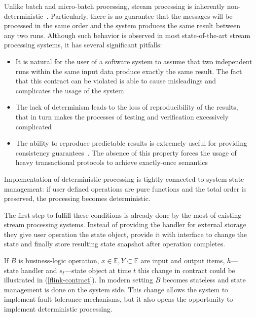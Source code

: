 
\label{motivation-section}

Unlike batch and micro-batch processing, stream processing is inherently non-deterministic~\cite{Zaharia:2012:DSE:2342763.2342773}. Particularly, there is no guarantee that the messages will be processed in the same order and the system produces the same result between any two runs. Although such behavior is observed in most state-of-the-art stream processing systems, it has several significant pitfalls:

\begin{itemize}
    \item It is natural for the user of a software system to assume that two independent runs within the same input data produce exactly the same result. The fact that this contract can be violated is able to cause misleadings and complicates the usage of the system
    \item The lack of determinism leads to the loss of reproducibility of the results, that in turn makes the processes of testing and verification excessively complicated
    \item The ability to reproduce predictable results is extremely useful for providing consistency guarantees~\cite{Stonebraker:2005:RRS:1107499.1107504}. The absence of this property forces the usage of heavy transactional protocols to achieve exactly-once semantics~\cite{Carbone:2017:SMA:3137765.3137777, jacques2016consistent}
\end{itemize}

Implementation of deterministic processing is tightly connected to system state management: if user defined operations are pure functions and the total order is preserved, the processing becomes deterministic.

The first step to fulfill these conditions is already done by the most of existing stream processing systems. Instead of providing the handler for external storage they give user operation the state object, provide it with interface to change the state and finally store resulting state snapshot after operation completes.

If $B$ is business-logic operation, $x \in \mathbb{E}, Y \subset \mathbb{E}$ are input and output items, $h$---state handler and $s_t$---state object at time $t$ this change in contract could be illustrated in (\ref{flink-contract}). In modern setting $B$ becomes stateless and state management is done on the system side. This change allows the system to implement fault tolerance mechanisms, but it also opens the opportunity to implement deterministic processing.

